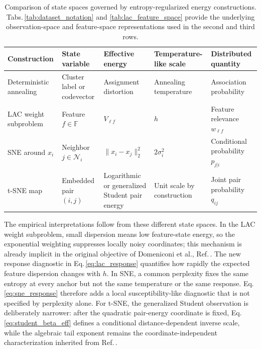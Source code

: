 \documentclass[11pt,a4paper]{article}
\theoremstyle{definition}
\theoremstyle{plain}
\begin{document}
\begin{table}[t]
\centering
\caption{Comparison of state spaces governed by entropy-regularized energy constructions. Tabs.\,\ref{tab:dataset_notation} and \ref{tab:lac_feature_space} provide the underlying observation-space and feature-space representations used in the second and third rows.}
\label{tab:correspondence}
\begingroup
\renewcommand{\arraystretch}{1.58}
\setlength{\tabcolsep}{5pt}
\small
\begin{tabularx}{\textwidth}{>{\raggedright\arraybackslash}p{} >{\raggedright\arraybackslash}p{} >{\raggedright\arraybackslash}p{} >{\raggedright\arraybackslash}p{} >{\raggedright\arraybackslash}X}
\toprule
\textbf{Construction} & \textbf{State variable} & \textbf{Effective energy} & \textbf{Temperature-like scale} & \textbf{Distributed quantity}\\
\midrule
Deterministic annealing & Cluster label or codevector & Assignment distortion & Annealing temperature & Association probability\\
LAC weight subproblem & Feature $f\in\mathbb F$ & $V_{\ell f}$ & $h$ & Feature relevance $w_{\ell f}$\\
SNE around $x_i$ & Neighbor $j\in\mathcal N_i$ & $\|x_i-x_j\|_2^2$ & $2\sigma_i^2$ & Conditional probability $p_{j|i}$\\
t-SNE map & Embedded pair $(i,j)$ & Logarithmic or generalized Student pair energy & Unit scale by construction & Joint pair probability $q_{ij}$\\
\bottomrule
\end{tabularx}
\endgroup
\end{table}

The empirical interpretations follow from these different state spaces. In the LAC weight subproblem, small dispersion means low feature-state energy, so the exponential weighting suppresses locally noisy coordinates; this mechanism is already implicit in the original objective of Domeniconi et al., Ref.\,\cite{domeniconi2007lac}. The new response diagnostic in Eq.\,\eqref{eq:lac_response} quantifies how rapidly the expected feature dispersion changes with $h$. In SNE, a common perplexity fixes the same entropy at every anchor but not the same temperature or the same response. Eq.\,\eqref{eq:sne_response} therefore adds a local susceptibility-like diagnostic that is not specified by perplexity alone. For t-SNE, the generalized Student observation is deliberately narrower: after the quadratic pair-energy coordinate is fixed, Eq.\,\eqref{eq:student_beta_eff} defines a conditional distance-dependent inverse scale, while the algebraic tail exponent remains the coordinate-independent characterization inherited from Ref.\,\cite{kobak2020heavy}.
\end{document}
